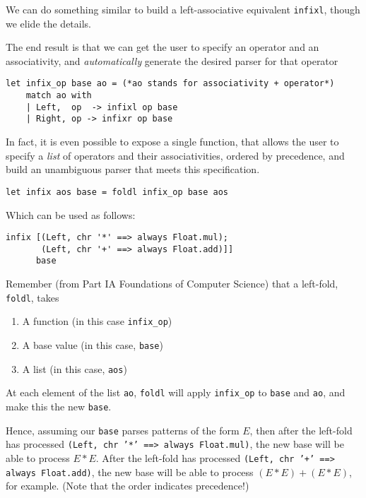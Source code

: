 We can do something similar to build a left-associative equivalent \texttt{infixl}, though we elide the details.

The end result is that we can get the user to specify an operator and an associativity, and \textit{automatically} generate the desired parser for that operator
\begin{verbatim}
let infix_op base ao = (*ao stands for associativity + operator*)
    match ao with
    | Left,  op  -> infixl op base
    | Right, op -> infixr op base
\end{verbatim}
In fact, it is even possible to expose a single function, that allows the user to specify a \textit{list} of operators and their associativities, ordered by precedence, and build an unambiguous parser that meets this specification.
\begin{verbatim}
let infix aos base = foldl infix_op base aos
\end{verbatim}
Which can be used as follows:
\begin{verbatim}
infix [(Left, chr '*' ==> always Float.mul);
       (Left, chr '+' ==> always Float.add)]]
      base 
\end{verbatim}
Remember (from \textsf{Part IA Foundations of Computer Science}) that a left-fold, \texttt{foldl}, takes
\begin{enumerate}
    \item A function (in this case \texttt{infix\_op})
    \item A base value (in this case, \texttt{base})
    \item A list (in this case, \texttt{aos})
\end{enumerate}

At each element of the list \texttt{ao}, \texttt{foldl} will apply \texttt{infix\_op} to \texttt{base} and \texttt{ao}, and make this the new \texttt{base}. 

Hence, assuming our \texttt{base} parses patterns of the form $E$, then after the left-fold has processed \texttt{(Left, chr '*' ==> always Float.mul)}, the new base will be able to process $E * E$. After the left-fold has processed \texttt{(Left, chr '+' ==> always Float.add)}, the new base will be able to process $(E*E) + (E*E)$, for example. (Note that the order indicates precedence!)


